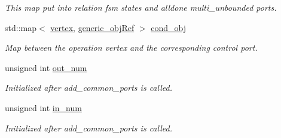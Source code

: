 \begin{DoxyCompactItemize}
\begin{DoxyCompactList}\small\item\em This map put into relation fsm states and alldone multi\+\_\+unbounded ports. \end{DoxyCompactList}\item 
std\+::map$<$ \hyperlink{graph_8hpp_abefdcf0544e601805af44eca032cca14}{vertex}, \hyperlink{generic__obj_8hpp_acb533b2ef8e0fe72e09a04d20904ca81}{generic\+\_\+obj\+Ref} $>$ \hyperlink{classControllerCreatorBaseStep_a6171b5c8241664c0d19f858bdd815a17}{cond\+\_\+obj}
\begin{DoxyCompactList}\small\item\em Map between the operation vertex and the corresponding control port. \end{DoxyCompactList}\item 
unsigned int \hyperlink{classControllerCreatorBaseStep_a7f9f0f6879672a2cd603cbf7179edd86}{out\+\_\+num}
\begin{DoxyCompactList}\small\item\em Initialized after add\+\_\+common\+\_\+ports is called. \end{DoxyCompactList}\item 
unsigned int \hyperlink{classControllerCreatorBaseStep_a7913a7aff7c71c580fbc76ada00a5a5f}{in\+\_\+num}
\begin{DoxyCompactList}\small\item\em Initialized after add\+\_\+common\+\_\+ports is called. \end{DoxyCompactList}\end{DoxyCompactItemize}
